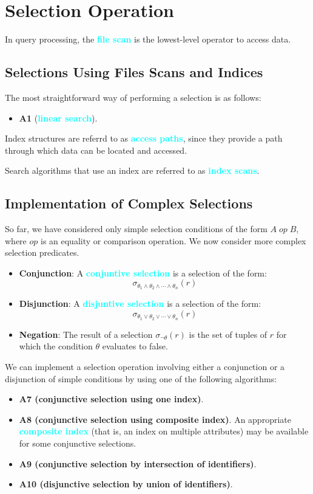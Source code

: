 \documentclass[a4paper,12pt,twoside,openany]{book}
\newcommand{\textcy}[1]{\textbf{\textcolor{cyan}{#1}}}
\begin{document}
\section{Selection Operation}

In query processing, the \textcy{file scan} is the lowest-level operator to access data.

\subsection{Selections Using Files Scans and Indices}

The most straightforward way of performing a selection is as follows:
\begin{itemize}
    \item \textbf{A1} (\textcy{linear search}).
\end{itemize}

Index structures are referrd to as \textcy{access paths}, since they provide a path through which data can be located and accessed.

Search algorithms that use an index are referred to as \textcy{index scans}.

\subsection{Implementation of Complex Selections}

So far, we have considered only simple selection conditions of the form $A\;op\;B$, where $op$ is an equality or comparison operation. We now consider more complex selection predicates.
\begin{itemize}
    \item \textbf{Conjunction}: A \textcy{conjuntive selection} is a selection of the form: $$\sigma_{\theta_1\land\theta_2\land\cdots\land\theta_n}(r)$$
    \item \textbf{Disjunction}: A \textcy{disjuntive selection} is a selection of the form: $$\sigma_{\theta_1\lor\theta_2\lor\cdots\lor\theta_n}(r)$$
    \item \textbf{Negation}: The result of a selection $\sigma_{\neg\theta}(r)$ is the set of tuples of $r$ for which the condition $\theta$ evaluates to false.
\end{itemize}

We can implement a selection operation involving either a conjunction or a disjunction of simple conditions by using one of the following algorithms:
\begin{itemize}
    \item \textbf{A7 (conjunctive selection using one index)}.
    \item \textbf{A8 (conjunctive selection using composite index)}. An appropriate \textcy{composite index} (that is, an index on multiple attributes) may be available for some conjunctive selections.
    \item \textbf{A9 (conjunctive selection by intersection of identifiers)}.
    \item \textbf{A10 (disjunctive selection by union of identifiers)}.
\end{itemize}
\end{document}
